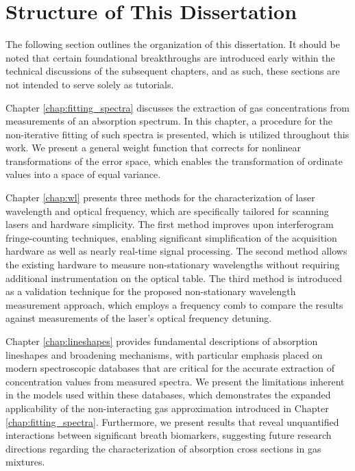 \documentclass[12pt]{report}
\begin{document}
	\section{Structure of This Dissertation}
	The following section outlines the organization of this dissertation. It should be noted that certain foundational breakthroughs are introduced early within the technical discussions of the subsequent chapters, and as such, these sections are not intended to serve solely as tutorials.%
	
	Chapter \ref{chap:fitting_spectra} discusses the extraction of gas concentrations from measurements of an absorption spectrum. In this chapter, a procedure for the non-iterative fitting of such spectra is presented, which is utilized throughout this work. We present a general weight function that corrects for nonlinear transformations of the error space, which enables the transformation of ordinate values into a space of equal variance.
	
	Chapter \ref{chap:wl} presents three methods for the characterization of laser wavelength and optical frequency, which are specifically tailored for scanning lasers and hardware simplicity. The first method improves upon interferogram fringe-counting techniques, enabling significant simplification of the acquisition hardware as well as nearly real-time signal processing. The second method allows the existing hardware to measure non-stationary wavelengths without requiring additional instrumentation on the optical table. The third method is introduced as a validation technique for the proposed non-stationary wavelength measurement approach, which employs a frequency comb to compare the results against measurements of the laser's optical frequency detuning.
	
	Chapter \ref{chap:lineshapes} provides fundamental descriptions of absorption lineshapes and broadening mechanisms, with particular emphasis placed on modern spectroscopic databases that are critical for the accurate extraction of concentration values from measured spectra. We present the limitations inherent in the models used within these databases, which demonstrates the expanded applicability of the non-interacting gas approximation introduced in Chapter \ref{chap:fitting_spectra}. Furthermore, we present results that reveal unquantified interactions between significant breath biomarkers, suggesting future research directions regarding the characterization of absorption cross sections in gas mixtures.
	
\end{document}
